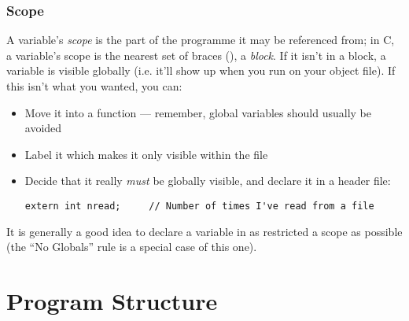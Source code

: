 \documentclass[10pt, t]{beamer}
\begin{document}
\begin{frame}[fragile]
\frametitle{Scope}
\label{sec-1_1_5}

A variable's \emph{scope} is the part of the programme it may be referenced from;  in C, a variable's scope
is the nearest set of braces (\code{\{\}}), a \emph{block}.  If it isn't in a block, a variable is visible globally
(i.e. it'll show up when you run  on your object file).  If this isn't what you wanted, you can:
 \pause

\begin{itemize}
\item Move it into a function --- remember, global variables should usually be avoided
\end{itemize}
 \pause

\begin{itemize}
\item Label it  which makes it only visible within the file
\end{itemize}
 \pause

\begin{itemize}
\item Decide that it really \emph{must} be globally visible, and declare it in a header file:
\begin{verbatim}
extern int nread;     // Number of times I've read from a file
\end{verbatim}
\end{itemize}

\pause
It is generally a good idea to declare a variable in as restricted a scope as possible (the ``No Globals'' rule 
is a special case of this one).
\end{frame}
\section{Program Structure}
\label{sec-2}
\end{document}
